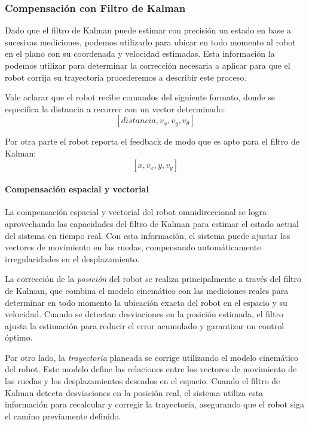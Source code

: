 \subsubsection{Compensación con Filtro de Kalman}

Dado que el filtro de Kalman puede estimar con precisión un estado en base a sucesivas mediciones, podemos utilizarlo para ubicar en todo momento al robot en el plano con su coordenada y velocidad estimadas. Esta información la podemos utilizar para determinar la corrección necesaria a aplicar para que el robot corrija su trayectoria procederemos a describir este proceso.

Vale aclarar que el robot recibe comandos del siguiente formato, donde se especifica la distancia a recorrer con un vector determinado:
$$ [distancia, v_x, v_y, v_\theta] $$

Por otra parte el robot reporta el feedback de modo que es apto para el filtro de Kalman:
$$ [x, v_x, y, v_y] $$

\paragraph{Compensación espacial y vectorial} \mbox{} \vspace{8pt}

La compensación espacial y vectorial del robot omnidireccional se logra aprovechando las capacidades del filtro de Kalman para estimar el estado actual del sistema en tiempo real. Con esta información, el sistema puede ajustar los vectores de movimiento en las ruedas, compensando automáticamente irregularidades en el desplazamiento.

La corrección de la \textit{posición} del robot se realiza principalmente a través del filtro de Kalman, que combina el modelo cinemático con las mediciones reales para determinar en todo momento la ubicación exacta del robot en el espacio y su velocidad. Cuando se detectan desviaciones en la posición estimada, el filtro ajusta la estimación para reducir el error acumulado y garantizar un control óptimo.

Por otro lado, la \textit{trayectoria} planeada se corrige utilizando el modelo cinemático del robot. Este modelo define las relaciones entre los vectores de movimiento de las ruedas y los desplazamientos deseados en el espacio. Cuando el filtro de Kalman detecta desviaciones en la posición real, el sistema utiliza esta información para recalcular y corregir la trayectoria, asegurando que el robot siga el camino previamente definido.

